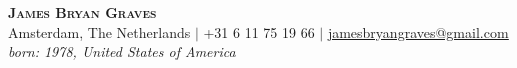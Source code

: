 \begin{center}
    \textbf{\Huge \scshape James Bryan Graves} \\ \vspace{1pt}
    \small Amsterdam, The Netherlands $|$ +31 6 11 75 19 66 $|$ \href{mailto:jamesbryangraves@gmail.com}{\underline{jamesbryangraves@gmail.com}} \\
    \small \emph{born: 1978, United States of America}
\end{center}